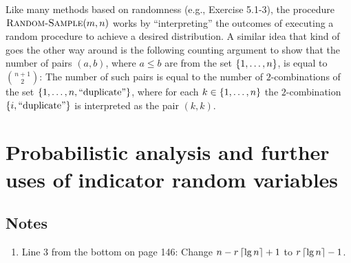 \begin{enumerate}[\thesection-1]
\begin{remark}
Like many methods based on randomness (e.g., Exercise 5.1-3), the procedure $\textnormal{\scshape Random-Sample}(m, n)$ works by ``interpreting'' the outcomes of executing a random procedure to achieve a desired distribution. A similar idea that kind of goes the other way around is the following counting argument to show that the number of pairs $(a, b)$, where $a \leq b$ are from the set $\left\{1, \ldots, n\right\}$, is equal to ${n + 1 \choose 2}$: The number of such pairs is equal to the number of $2$-combinations of the set $\left\{1, \ldots, n, \mbox{``duplicate''}\right\}$, where for each $k \in \left\{1, \ldots, n\right\}$ the $2$-combination $\left\{i, \mbox{``duplicate''}\right\}$ is interpreted as the pair $(k, k)$.
\end{remark}
%
\end{enumerate}

\section{Probabilistic analysis and further uses of indicator random variables}
\subsection*{Notes}
\begin{enumerate}[1.]
%
\item Line 3 from the bottom on page 146: Change $n - r \left\lceil\lg n\right\rceil + 1$ to $r \left\lceil\lg n\right\rceil - 1$.
%
\end{enumerate}

